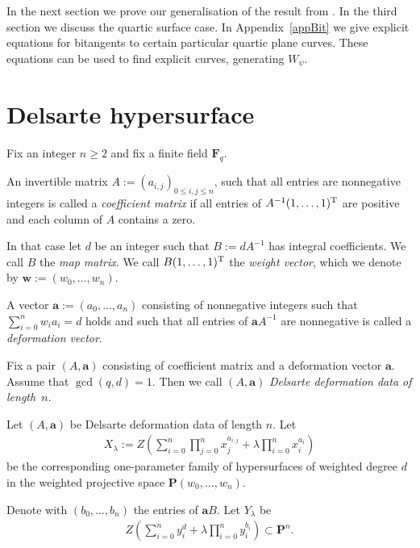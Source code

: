 \documentclass[pdftex]{sigma}
\numberwithin{equation}{section}
\begin{document}
In the next section we prove our generalisation of the result from \cite{DKSSVW}. In the third section we discuss the quartic surface case. In Appendix~\ref{appBit} we give explicit equations for bitangents to certain particular quartic plane curves. These equations can be used to f\/ind explicit curves, generating $W_{\psi}$.

\section{Delsarte hypersurface}

Fix an integer $n\geq 2$ and f\/ix a f\/inite f\/ield $\mathbf{F}_q$.
\begin{Definition}An invertible matrix $A:=(a_{i,j})_{0\leq i,j\leq n}$, such that all entries are nonnegative integers is called a \emph{coefficient matrix} if all entries of $A^{-1}(1,\dots,1)^{\rm T}$ are positive and each column of $A$ contains a zero.

In that case let $d$ be an integer such that $B:=dA^{-1}$ has integral coef\/f\/icients. We call $B$ the \emph{map matrix}. We call $B(1,\dots,1)^{\rm T}$ the \emph{weight vector}, which we denote by $\mathbf{w}:=(w_0,\dots,w_n)$.

A vector $\mathbf{a}:=(a_0,\dots,a_n)$ consisting of nonnegative integers such that $\sum\limits_{i=0}^n w_ia_i=d$ holds and such that all entries of $\mathbf{a} A^{-1} $ are nonnegative is called a \emph{deformation vector}.
\end{Definition}

\begin{Definition} Fix a pair $(A,\mathbf{a})$ consisting of coef\/f\/icient matrix and a deformation vector $\mathbf{a}$. Assume that $\gcd(q,d)=1$. Then we call $(A,\mathbf{a})$ \emph{Delsarte deformation data of length~$n$}.
\end{Definition}

Let $(A,\mathbf{a})$ be Delsarte deformation data of length $n$. Let
\begin{gather*} X_\lambda:=Z\left( \sum_{i=0}^n \prod_{j=0}^n x_j^{a_{i,j}} + \lambda \prod_{i=0}^n x_i^{a_i}\right)\end{gather*}
be the corresponding one-parameter family of hypersurfaces of weighted degree $d$ in the weighted projective space $\mathbf{P}(w_0,\dots,w_n)$.

Denote with $(b_0,\dots,b_n)$ the entries of $\mathbf{a} B $. Let $Y_{\lambda}$ be
\begin{gather*} Z\left(\sum_{i=0}^n y_i^d +\lambda \prod_{i=0}^n y_i^{b_i}\right) \subset \mathbf{P}^n.\end{gather*}
\end{document}
